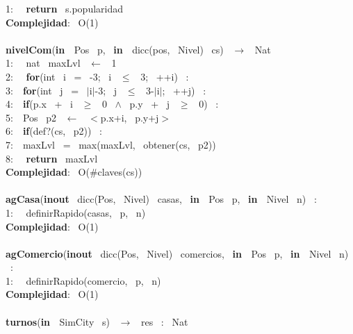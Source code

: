 \begin{Algoritmos}
{1: \  \ \textbf{return} \ s.popularidad\\
\textbf{Complejidad}: \ O(1)\\
\makebox[\linewidth]{\rule{\textwidth}{0.4pt}}
\\
\makebox[\linewidth]{\rule{\textwidth}{0.4pt}}
\textbf{nivelCom}(\textbf{in \ }Pos \ p, \ \textbf{in \ }dicc(pos, \ Nivel) \ cs) \ $\rightarrow $ \ Nat\\
1: \  \ nat \ maxLvl \ $\leftarrow$ \ 1\\
2: \  \ \textbf{for}(int \ i \ = \ -3; \ i \ $\leq$ \ 3; \ ++i) \ :\\
3:\indent  \  \ \textbf{for}(int \ j \ = \ $\mid$i$\mid$-3; \ j \ $\leq$ \ 3-$\mid$i$\mid$; \ ++j) \ :\\
4:\indent \indent  \  \ \textbf{if}(p.x \ + \ i \ $\geq$ \ 0 \ $\wedge$ \ p.y \ + \ j \ $\geq$ \ 0) \ :\\
5:\indent \indent \indent  \  \ Pos \ p2 \ $\leftarrow$ \ $<$p.x+i, \ p.y+j$>$ \ \\
6:\indent \indent \indent  \  \ \textbf{if}(def?(cs, \ p2)) \ :\\
7:\indent \indent \indent \indent  \  \ maxLvl \ = \ max(maxLvl, \ obtener(cs, \ p2))\\
8: \  \ \textbf{return} \ maxLvl\\
\textbf{Complejidad}: \ O($ \# $claves(cs))\\
\makebox[\linewidth]{\rule{\textwidth}{0.4pt}}
\\
\makebox[\linewidth]{\rule{\textwidth}{0.4pt}}
\textbf{agCasa}(\textbf{inout} \ dicc(Pos, \ Nivel) \ casas, \ \textbf{in \ }Pos \ p, \ \textbf{in \ }Nivel \ n) \ :\\
1: \  \ definirRapido(casas, \ p, \ n)\\
\textbf{Complejidad}: \ O(1)\\
\makebox[\linewidth]{\rule{\textwidth}{0.4pt}}
\\
\makebox[\linewidth]{\rule{\textwidth}{0.4pt}}
\textbf{agComercio}(\textbf{inout} \ dicc(Pos, \ Nivel) \ comercios, \ \textbf{in \ }Pos \ p, \ \textbf{in \ }Nivel \ n) \ :\\
1: \  \ definirRapido(comercio, \ p, \ n)\\
\textbf{Complejidad}: \ O(1)\\
\makebox[\linewidth]{\rule{\textwidth}{0.4pt}}
\\
\makebox[\linewidth]{\rule{\textwidth}{0.4pt}}
\textbf{turnos}(\textbf{in \ }SimCity \ s) \ $\rightarrow $ \ res \ : \ Nat\\
}
\end{Algoritmos}
